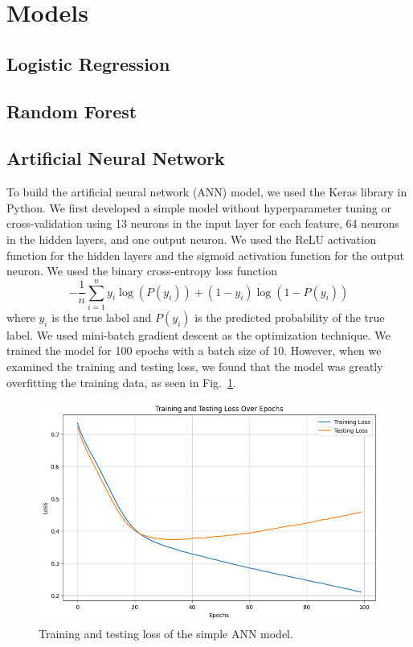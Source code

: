 \section{Models}

\subsection{Logistic Regression}

\subsection{Random Forest}

\subsection{Artificial Neural Network}

To build the artificial neural network (ANN) model, we used the Keras library in Python. We first developed a simple model without hyperparameter tuning or cross-validation using 13 neurons in the input layer for each feature, 64 neurons in the hidden layers, and one output neuron. We used the ReLU activation function for the hidden layers and the sigmoid activation function for the output neuron. We used the binary cross-entropy loss function 
\[
-\frac{1}{n}\sum_{i=1}^{n}y_i \log (P(y_i)) + (1 - y_i) \log (1 - P(y_i))
\]
where \(y_i\) is the true label and \(P(y_i)\) is the predicted probability of the true label.
We used mini-batch gradient descent as the optimization technique. We trained the model for 100 epochs with a batch size of 10. However, when we examined the training and testing loss, we found that the model was greatly overfitting the training data, as seen in Fig.~\ref{annoverfitting}. 

\begin{figure}[htbp]
    \centerline{\includegraphics[width=0.7\columnwidth]{img/annoverfitting.png}}
    \caption{Training and testing loss of the simple ANN model.}\label{annoverfitting}
\end{figure}

